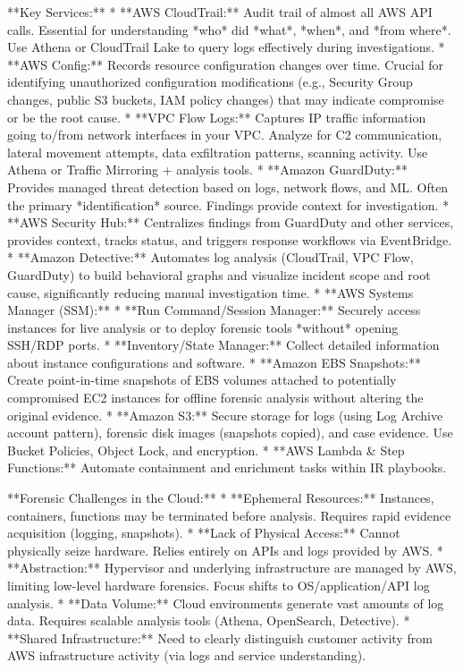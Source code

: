 \documentclass{article}
\begin{document}
**Key Services:**
* **AWS CloudTrail:** Audit trail of almost all AWS API calls. Essential for understanding *who* did *what*, *when*, and *from where*. Use Athena or CloudTrail Lake to query logs effectively during investigations.
* **AWS Config:** Records resource configuration changes over time. Crucial for identifying unauthorized configuration modifications (e.g., Security Group changes, public S3 buckets, IAM policy changes) that may indicate compromise or be the root cause.
* **VPC Flow Logs:** Captures IP traffic information going to/from network interfaces in your VPC. Analyze for C2 communication, lateral movement attempts, data exfiltration patterns, scanning activity. Use Athena or Traffic Mirroring + analysis tools.
* **Amazon GuardDuty:** Provides managed threat detection based on logs, network flows, and ML. Often the primary *identification* source. Findings provide context for investigation.
* **AWS Security Hub:** Centralizes findings from GuardDuty and other services, provides context, tracks status, and triggers response workflows via EventBridge.
* **Amazon Detective:** Automates log analysis (CloudTrail, VPC Flow, GuardDuty) to build behavioral graphs and visualize incident scope and root cause, significantly reducing manual investigation time.
* **AWS Systems Manager (SSM):**
    * **Run Command/Session Manager:** Securely access instances for live analysis or to deploy forensic tools *without* opening SSH/RDP ports.
    * **Inventory/State Manager:** Collect detailed information about instance configurations and software.
* **Amazon EBS Snapshots:** Create point-in-time snapshots of EBS volumes attached to potentially compromised EC2 instances for offline forensic analysis without altering the original evidence.
* **Amazon S3:** Secure storage for logs (using Log Archive account pattern), forensic disk images (snapshots copied), and case evidence. Use Bucket Policies, Object Lock, and encryption.
* **AWS Lambda & Step Functions:** Automate containment and enrichment tasks within IR playbooks.

**Forensic Challenges in the Cloud:**
* **Ephemeral Resources:** Instances, containers, functions may be terminated before analysis. Requires rapid evidence acquisition (logging, snapshots).
* **Lack of Physical Access:** Cannot physically seize hardware. Relies entirely on APIs and logs provided by AWS.
* **Abstraction:** Hypervisor and underlying infrastructure are managed by AWS, limiting low-level hardware forensics. Focus shifts to OS/application/API log analysis.
* **Data Volume:** Cloud environments generate vast amounts of log data. Requires scalable analysis tools (Athena, OpenSearch, Detective).
* **Shared Infrastructure:** Need to clearly distinguish customer activity from AWS infrastructure activity (via logs and service understanding).
\end{document}
